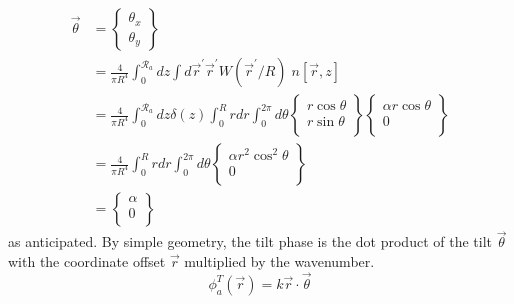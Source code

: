 \begin{equation}
\begin{aligned}
\vec{\theta} & = 
\left\{
\begin{array}{c}
\theta_{x} \\
\theta_{y} 
\end{array} 
\right\}\\
& = 
\frac{4}{\pi R^{4}} \int_{0}^{\mathcal{R}_{a}} dz 
\int d\vec{r}^{\prime} \vec{r}^{\prime} W(\vec{r}^{\prime}/R) \; n\left[\vec{r},z\right] \\
& = 
\frac{4}{\pi R^{4}} \int_{0}^{\mathcal{R}_{a}} dz \delta\left(z\right)
\int_{0}^{R} r dr \int_{0}^{2\pi} d\theta 
\left\{
\begin{array}{c}
r \cos \theta \\
r \sin \theta \\ 
\end{array}
\right\}
\left\{
\begin{array}{c}
\alpha r \cos \theta \\
0 \\ 
\end{array}
\right\} \\
& = 
\frac{4}{\pi R^{4}}  
\int_{0}^{R} r dr \int_{0}^{2\pi} d\theta 
\left\{
\begin{array}{c}
\alpha r^{2} \cos^{2} \theta \\
0 \\ 
\end{array}
\right\}\\
& = 
\left\{
\begin{array}{c}
\alpha \\
0 \\ 
\end{array}
\right\}
\end{aligned}
\end{equation}
as anticipated.  By simple geometry, the tilt phase is the dot product
of the tilt $\vec{\theta}$ with the coordinate offset
$\vec{r}$ multiplied by the wavenumber.
\begin{equation}\label{tiltphase_n}
\phi^{T}_{a}\left(\vec{r}\right) = k \vec{r}  \cdot \vec{\theta} 
\end{equation}

